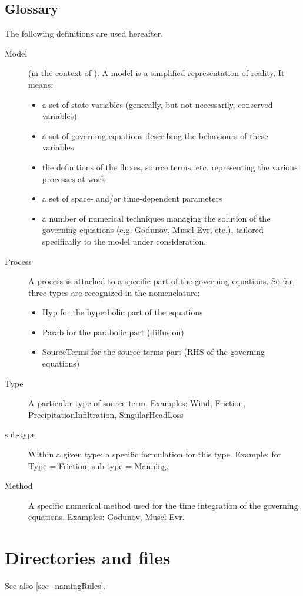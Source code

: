 \subsection{Glossary}\label{subsec_glossary}
The following definitions are used hereafter.
\begin{description}
\item [Model] (in the context of \swSolver). A model is a simplified representation of reality. It means:
\begin{itemize}
\item a set of state variables (generally, but not necessarily, conserved variables)
\item a set of governing equations describing the behaviours of these variables
\item the definitions of the fluxes, source terms, etc. representing the various processes at work
\item a set of space- and/or time-dependent parameters
\item a number of numerical techniques managing the solution of the governing equations (e.g. Godunov, Muscl-Evr, etc.), tailored specifically to the model under consideration.
\end{itemize}
\item [Process] A process is attached to a specific part of the governing equations. So far, three types are recognized in the \swSolver nomenclature:
\begin{itemize}
\item Hyp for the hyperbolic part of the equations
\item Parab for the parabolic part (diffusion)
\item SourceTerms for the source terms part (RHS of the governing equations)
\end{itemize}
\item [Type] A particular type of source term. Examples: Wind, Friction, PrecipitationInfiltration, SingularHeadLoss
\item [sub-type] Within a given type: a specific formulation for this type. Example: for Type = Friction, sub-type = Manning.
\item [Method] A specific numerical method used for the time integration of the governing equations. Examples: Godunov, Muscl-Evr.
\end{description}
%
\section{Directories and files}\label{sec_sourceFileNameStructure}
See also \ref{sec_namingRules}.
